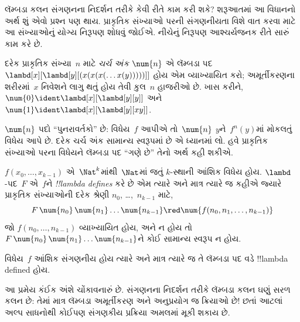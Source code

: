 \documentclass[../../../include/open-logic-section]{subfiles}
\begin{document}

લૅમ્બડા કલન સંગણનના નિદર્શન તરીકે કેવી રીતે કામ કરી શકે? શરૂઆતમાં
આ વિધાનનો અર્થ શું એવો પ્રશ્ન પણ થાય. પ્રાકૃતિક સંખ્યાઓ પરની
સંગણનીયતા વિશે વાત કરવા માટે આ સંખ્યાઓનું યોગ્ય નિરૂપણ શોધવું
જોઈએ. નીચેનું નિરૂપણ આશ્ચર્યજનક રીતે સારું કામ કરે છે.

\begin{defn}
દરેક પ્રાકૃતિક સંખ્યા~$n$ માટે \emph{ચર્ચ અંક}
$\num{n}$ એ લૅમ્બડા પદ $\lambd[x][\lambd[y][(x(x(x(\dots
x(y)))))]]$ હોય એમ વ્યાખ્યાયિત કરો; અમૂર્તીકરણના શરીરમાં~$x$
નિવેશને લાગુ થતું હોય તેવી કુલ~$n$ હાજરીઓ છે. ખાસ કરીને,
$\num{0}\ident\lambd[x][\lambd[y][y]]$ અને
$\num{1}\ident\lambd[x][\lambd[y][xy]]$.
\end{defn}

$\num{n}$ પદો ``પુનરાવર્તકો'' છે: વિધેય~$f$ આપીએ તો~$\num{n}$
$y$ને~$f^n(y)$માં મોકલતું વિધેય આપે છે. દરેક ચર્ચ અંક સામાન્ય
સ્વરૂપમાં છે એ ધ્યાનમાં લો. હવે પ્રાકૃતિક સંખ્યાઓ પરના વિધેયને
લૅમ્બડા પદ ``ગણે છે'' તેનો અર્થ કહી શકીએ.

\begin{defn}
$f(x_0, \dots, x_{k-1})$ એ~$\Nat^k$માંથી~$\Nat$માં જતું
$k$-સ્થાની આંશિક વિધેય હોય. $\lambd$-પદ~$F$ એ~$f$ને
\emph{!!{lambda define}s} કરે છે એમ ત્યારે અને માત્ર ત્યારે જ
કહીએ જ્યારે પ્રાકૃતિક સંખ્યાઓની દરેક શ્રેણી $n_0$, \dots,~$n_{k-1}$
માટે,
\[
F\, \num{n_0}\, \num{n_1} \dots \num{n_{k-1}} \red \num{f(n_0, n_1, \dots,
  n_{k-1})}
\]
જો $f(n_0, \dots, n_{k-1})$ વ્યાખ્યાયિત હોય, અને ન હોય તો
$F\, \num{n_0}\, \num{n_1} \dots \num{n_{k-1}}$ને કોઈ સામાન્ય
સ્વરૂપ ન હોય.
\end{defn}

\begin{thm}
વિધેય~$f$ આંશિક સંગણનીય હોય ત્યારે અને માત્ર ત્યારે જ તે
લૅમ્બડા પદ વડે !!{lambda defined} હોય.
\end{thm}

\begin{explain}
આ પ્રમેય કંઈક અંશે ચોંકાવનારું છે. સંગણનના નિદર્શન તરીકે
લૅમ્બડા કલન ઘણું સરળ કલન છે: તેમાં માત્ર લૅમ્બડા અમૂર્તીકરણ અને
અનુપ્રયોગ જ ક્રિયાઓ છે!{} છતાં આટલાં અલ્પ સાધનોથી કોઈપણ
સંગણકીય પ્રક્રિયા અમલમાં મૂકી શકાય છે.
\end{explain}
\end{document}
